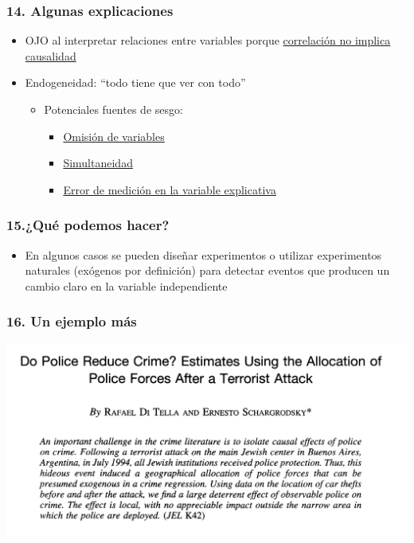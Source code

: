 \documentclass{beamer}
\begin{document}
\begin{frame} \label{uno}
\frametitle{14. Algunas explicaciones}
\begin{itemize}
    \item OJO al interpretar relaciones entre variables porque \hyperlink{hdos}{correlación no implica causalidad}   \vspace{2mm}
    \item Endogeneidad: ``todo tiene que ver con todo'' \vspace{1mm}
    \begin{itemize} 
        \item Potenciales fuentes de sesgo:
        \begin{itemize}
            \item \hyperlink{htres}{Omisión de variables}  
            \item \hyperlink{hcuatro}{Simultaneidad} 
            \item \hyperlink{hcinco}{Error de medición en la variable explicativa}
        \end{itemize}
    \end{itemize}
\end{itemize}
\end{frame}

\begin{frame} 
\frametitle{15.¿Qué podemos hacer?}
\begin{itemize}
    \item  En algunos casos se pueden diseñar experimentos o utilizar experimentos naturales (exógenos por definición) para detectar eventos que producen un cambio claro en la variable independiente
\end{itemize}
\end{frame}

\begin{frame} 
\frametitle{16. Un ejemplo más}
\begin{center}
    \includegraphics[scale=0.12]{Figures/Introduccion_1.7_Dopolice.jpg}
\end{center}
\end{frame}
\end{document}
